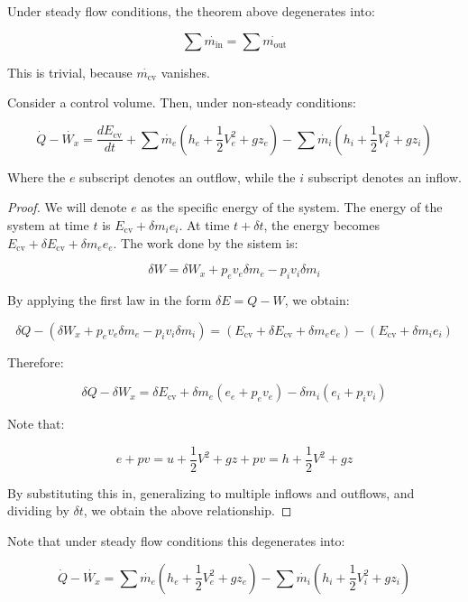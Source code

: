 \documentclass{article}
\begin{document}
\begin{proposition}
    Under steady flow conditions, the theorem above degenerates into:

    \[ \sum \dot{m_\text{in}} = \sum \dot{m_\text{out}} \]

    This is trivial, because $\dot{m_\text{cv}}$ vanishes.
\end{proposition}

\begin{theorem}
    Consider a control volume. Then, under non-steady conditions:

    \[ \dot{Q} - \dot{W_x} = \frac{dE_\text{cv}}{dt} + \sum \dot{m_e}(h_e + \frac{1}{2}V_e^2 + gz_e) - \sum \dot{m_i}(h_i + \frac{1}{2}V_i^2 + gz_i) \]

    Where the $e$ subscript denotes an outflow, while the $i$ subscript denotes an inflow.
\end{theorem}

\begin{proof}
    We will denote $e$ as the specific energy of the system. The energy of the system at time $t$ is $E_\text{cv} + \delta m_ie_i$. At time $t + \delta t$, the energy becomes $E_\text{cv} + \delta E_\text{cv} + \delta m_e e_e$. The work done by the sistem is:

    \[ \delta W = \delta W_x + p_ev_e\delta m_e - p_iv_i\delta m_i \]

    By applying the first law in the form $\delta E = Q - W$, we obtain:

    \[ \delta Q - (\delta W_x + p_ev_e\delta m_e - p_iv_i\delta m_i) = (E_\text{cv} + \delta E_\text{cv} + \delta m_e e_e) - (E_\text{cv} + \delta m_ie_i) \]

    Therefore:

    \[ \delta Q - \delta W_x = \delta E_\text{cv} + \delta m_e(e_e + p_ev_e) - \delta m_i(e_i + p_iv_i) \]

    Note that:

    \[ e + pv = u + \frac{1}{2}V^2 + gz + pv = h + \frac{1}{2}V^2 + gz \]

    By substituting this in, generalizing to multiple inflows and outflows, and dividing by $\delta t$, we obtain the above relationship.
\end{proof}

Note that under steady flow conditions this degenerates into:

\[ \dot{Q} - \dot{W_x} = \sum \dot{m_e}(h_e + \frac{1}{2}V_e^2 + gz_e) - \sum \dot{m_i}(h_i + \frac{1}{2}V_i^2 + gz_i) \]
\end{document}
